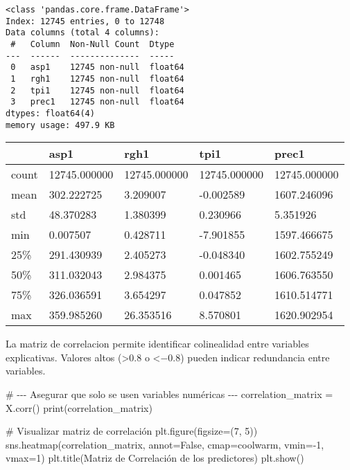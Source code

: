 \documentclass[
  letterpaper,
  DIV=11,
  numbers=noendperiod]{scrartcl}
\newenvironment{Shaded}{\begin{snugshade}}{\end{snugshade}}
\newcommand{\BuiltInTok}[1]{\textcolor[rgb]{0.00,0.23,0.31}{#1}}
\newcommand{\CommentTok}[1]{\textcolor[rgb]{0.37,0.37,0.37}{#1}}
\newcommand{\DecValTok}[1]{\textcolor[rgb]{0.68,0.00,0.00}{#1}}
\newcommand{\NormalTok}[1]{\textcolor[rgb]{0.00,0.23,0.31}{#1}}
\newcommand{\OperatorTok}[1]{\textcolor[rgb]{0.37,0.37,0.37}{#1}}
\newcommand{\StringTok}[1]{\textcolor[rgb]{0.13,0.47,0.30}{#1}}
\newcommand{\VariableTok}[1]{\textcolor[rgb]{0.07,0.07,0.07}{#1}}
\begin{document}
\begin{verbatim}
<class 'pandas.core.frame.DataFrame'>
Index: 12745 entries, 0 to 12748
Data columns (total 4 columns):
 #   Column  Non-Null Count  Dtype  
---  ------  --------------  -----  
 0   asp1    12745 non-null  float64
 1   rgh1    12745 non-null  float64
 2   tpi1    12745 non-null  float64
 3   prec1   12745 non-null  float64
dtypes: float64(4)
memory usage: 497.9 KB
\end{verbatim}

\begin{longtable}[]{@{}lllll@{}}
\toprule\noalign{}
& asp1 & rgh1 & tpi1 & prec1 \\
\midrule\noalign{}
\endhead
\bottomrule\noalign{}
\endlastfoot
count & 12745.000000 & 12745.000000 & 12745.000000 & 12745.000000 \\
mean & 302.222725 & 3.209007 & -0.002589 & 1607.246096 \\
std & 48.370283 & 1.380399 & 0.230966 & 5.351926 \\
min & 0.007507 & 0.428711 & -7.901855 & 1597.466675 \\
25\% & 291.430939 & 2.405273 & -0.048340 & 1602.755249 \\
50\% & 311.032043 & 2.984375 & 0.001465 & 1606.763550 \\
75\% & 326.036591 & 3.654297 & 0.047852 & 1610.514771 \\
max & 359.985260 & 26.353516 & 8.570801 & 1620.902954 \\
\end{longtable}

La matriz de correlacion permite identificar colinealidad entre
variables explicativas. Valores altos (\textgreater0.8 o \textless−0.8)
pueden indicar redundancia entre variables.

\begin{Shaded}
\begin{Highlighting}[]
\CommentTok{\# {-}{-}{-} Asegurar que solo se usen variables numéricas {-}{-}{-}}
\NormalTok{correlation\_matrix }\OperatorTok{=}\NormalTok{ X.corr()}
\BuiltInTok{print}\NormalTok{(correlation\_matrix)}

\CommentTok{\# Visualizar matriz de correlación}
\NormalTok{plt.figure(figsize}\OperatorTok{=}\NormalTok{(}\DecValTok{7}\NormalTok{, }\DecValTok{5}\NormalTok{))}
\NormalTok{sns.heatmap(correlation\_matrix, annot}\OperatorTok{=}\VariableTok{False}\NormalTok{, cmap}\OperatorTok{=}\StringTok{\textquotesingle{}coolwarm\textquotesingle{}}\NormalTok{, vmin}\OperatorTok{={-}}\DecValTok{1}\NormalTok{, vmax}\OperatorTok{=}\DecValTok{1}\NormalTok{)}
\NormalTok{plt.title(}\StringTok{\textquotesingle{}Matriz de Correlación de los predictores\textquotesingle{}}\NormalTok{)}
\NormalTok{plt.show()}
\end{Highlighting}
\end{Shaded}
\end{document}
